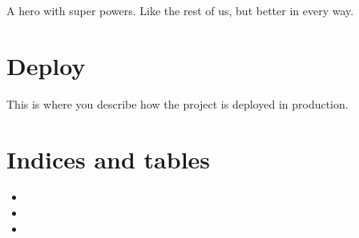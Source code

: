\documentclass[letterpaper,10pt,english]{sphinxmanual}
\begin{document}

\begin{fulllineitems}
\label{\detokenize{models:superheroes.models.Superhero}}
A hero with super powers. Like the rest of us, but better in every way.

\begin{fulllineitems}
\label{\detokenize{models:superheroes.models.Superhero.DoesNotExist}}
\end{fulllineitems}


\begin{fulllineitems}
\label{\detokenize{models:superheroes.models.Superhero.MultipleObjectsReturned}}
\end{fulllineitems}


\end{fulllineitems}



\chapter{Deploy}
\label{\detokenize{deploy:deploy}}\label{\detokenize{deploy::doc}}
This is where you describe how the project is deployed in production.


\chapter{Indices and tables}
\label{\detokenize{index:indices-and-tables}}\begin{itemize}
\item {} 

\item {} 

\item {} 

\end{itemize}
\end{document}
